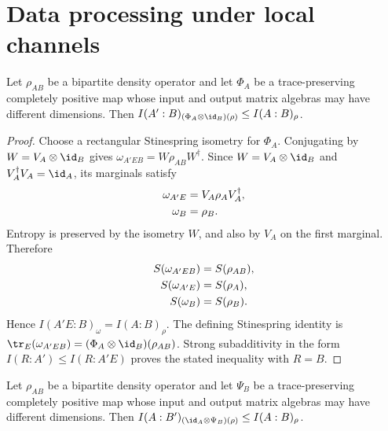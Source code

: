\section{Data processing under local channels}

\begin{theorem}
    \label{thm:mutual_information_data_processing_left}
    \leanok
    Let $\rho_{AB}$ be a bipartite density operator and let $\Phi_A$ be a
    trace-preserving completely positive map whose input and output matrix
    algebras may have different dimensions. Then
    $I(A':B)_{(\Phi_A\otimes\id_B)(\rho)}\leq I(A:B)_\rho$.
\end{theorem}

\begin{proof}
    \leanok
    Choose a rectangular Stinespring isometry for $\Phi_A$. Conjugating by
    $W=V_A\otimes\id_B$ gives
    $\omega_{A'EB}=W\rho_{AB}W^\dagger$. Since
    $W=V_A\otimes\id_B$ and $V_A^\dagger V_A=\id_A$, its marginals satisfy
    \begin{align}
        \omega_{A'E} & =V_A\rho_A V_A^\dagger, \notag \\
        \omega_B     & =\rho_B.
        \notag
    \end{align}
    Entropy is preserved by the isometry $W$, and also by $V_A$ on the first
    marginal. Therefore
    \begin{align}
        S(\omega_{A'EB}) & =S(\rho_{AB}), \notag \\
        S(\omega_{A'E})  & =S(\rho_A), \notag    \\
        S(\omega_B)      & =S(\rho_B).
        \notag
    \end{align}
    Hence $I(A'E:B)_\omega=I(A:B)_\rho$. The defining Stinespring identity is
    $\tr_E(\omega_{A'EB})=(\Phi_A\otimes\id_B)(\rho_{AB})$.
    Strong subadditivity in the form $I(R:A')\leq I(R:A'E)$ proves the stated
    inequality with $R=B$.
\end{proof}

\begin{theorem}
    \label{thm:mutual_information_data_processing_right}
    \leanok
    Let $\rho_{AB}$ be a bipartite density operator and let $\Psi_B$ be a
    trace-preserving completely positive map whose input and output matrix
    algebras may have different dimensions. Then
    $I(A:B')_{(\id_A\otimes\Psi_B)(\rho)}\leq I(A:B)_\rho$.
\end{theorem}

